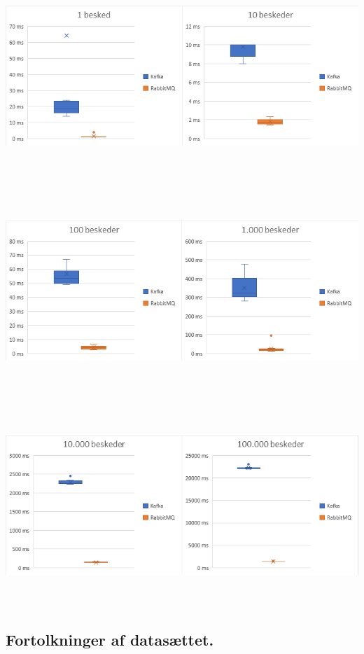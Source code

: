 \documentclass[
]{article}
\begin{document}
\includegraphics[width=5.5in,height=3in]{media/media/image1.png}

\includegraphics[width=5.5in,height=3in]{media/media/image2.png}

\includegraphics[width=5.5in,height=3in]{media/media/image3.png}


\hypertarget{fortolkninger-af-datasuxe6ttet.}{%
\subsection{Fortolkninger af
datasættet.}\label{fortolkninger-af-datasuxe6ttet.}}
\end{document}
